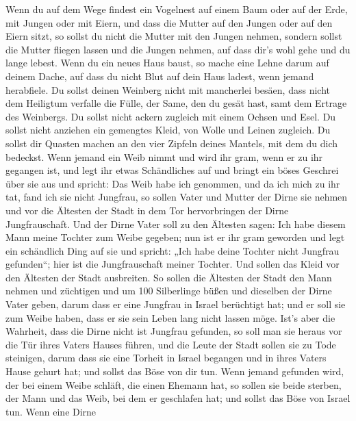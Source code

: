  Wenn du auf dem Wege findest ein Vogelnest auf einem Baum
oder auf der Erde, mit Jungen oder mit Eiern, und dass die Mutter auf
den Jungen oder auf den Eiern sitzt, so sollst du nicht die Mutter mit
den Jungen nehmen,  sondern sollst die Mutter fliegen lassen
und die Jungen nehmen, auf dass dir's wohl gehe und du lange lebest.
 Wenn du ein neues Haus baust, so mache eine Lehne darum auf
deinem Dache, auf dass du nicht Blut auf dein Haus ladest, wenn jemand
herabfiele.  Du sollst deinen Weinberg nicht mit mancherlei
besäen, dass nicht dem Heiligtum verfalle die Fülle, der Same, den du
gesät hast, samt dem Ertrage des Weinbergs.  Du sollst
nicht ackern zugleich mit einem Ochsen und Esel.  Du sollst
nicht anziehen ein gemengtes Kleid, von Wolle und Leinen zugleich.
 Du sollst dir Quasten machen an den vier Zipfeln deines
Mantels, mit dem du dich bedeckst.  Wenn jemand ein Weib
nimmt und wird ihr gram, wenn er zu ihr gegangen ist,  und
legt ihr etwas Schändliches auf und bringt ein böses Geschrei über sie
aus und spricht: Das Weib habe ich genommen, und da ich mich zu ihr tat,
fand ich sie nicht Jungfrau,  so sollen Vater und Mutter
der Dirne sie nehmen und vor die Ältesten der Stadt in dem Tor
hervorbringen der Dirne Jungfrauschaft.  Und der Dirne
Vater soll zu den Ältesten sagen: Ich habe diesem Mann meine Tochter zum
Weibe gegeben; nun ist er ihr gram geworden  und legt ein
schändlich Ding auf sie und spricht: „Ich habe deine Tochter nicht
Jungfrau gefunden``; hier ist die Jungfrauschaft meiner Tochter. Und
sollen das Kleid vor den Ältesten der Stadt ausbreiten.  So
sollen die Ältesten der Stadt den Mann nehmen und züchtigen
 und um 100 Silberlinge büßen und dieselben der Dirne Vater
geben, darum dass er eine Jungfrau in Israel berüchtigt hat; und er soll
sie zum Weibe haben, dass er sie sein Leben lang nicht lassen möge.
 Ist's aber die Wahrheit, dass die Dirne nicht ist Jungfrau
gefunden,  so soll man sie heraus vor die Tür ihres Vaters
Hauses führen, und die Leute der Stadt sollen sie zu Tode steinigen,
darum dass sie eine Torheit in Israel begangen und in ihres Vaters Hause
gehurt hat; und sollst das Böse von dir tun.  Wenn jemand
gefunden wird, der bei einem Weibe schläft, die einen Ehemann hat, so
sollen sie beide sterben, der Mann und das Weib, bei dem er geschlafen
hat; und sollst das Böse von Israel tun.  Wenn eine Dirne
